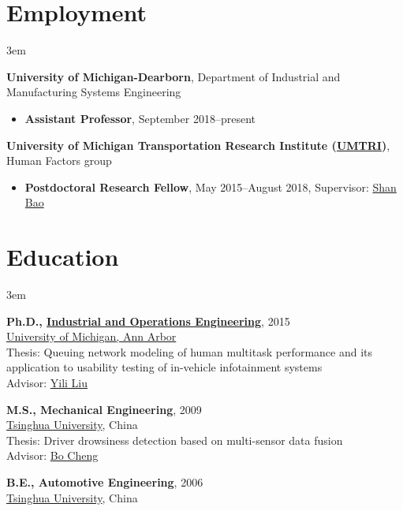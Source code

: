 \documentclass[11pt]{article}
\newenvironment{main}
{\begin{adjustwidth}{3em}{}}
{\end{adjustwidth}}
\begin{document}
\section*{Employment}
\begin{main}

\textbf{University of Michigan-Dearborn}, Department of Industrial and Manufacturing Systems Engineering

\begin{itemize}
    \item[] \textbf{Assistant Professor}, September 2018–present
\end{itemize}

\textbf{University of Michigan Transportation Research Institute (\href{http://www.umtri.umich.edu/}{UMTRI})}, Human Factors group

\begin{itemize}
    \item[] \textbf{Postdoctoral Research Fellow}, May 2015–August 2018, Supervisor: \href{https://sites.google.com/umich.edu/hfet-lab/people}{Shan Bao}
\end{itemize}


\end{main}
\section*{Education}
\begin{main}

\textbf{Ph.D., \href{https://ioe.engin.umich.edu/}{Industrial and Operations Engineering}}, 2015\\
\href{https://umich.edu/}{University of Michigan, Ann Arbor}\\
Thesis: Queuing network modeling of human multitask performance and its application to usability testing of in-vehicle infotainment systems\\
Advisor: \href{https://ioe.engin.umich.edu/people/yili-liu/}{Yili Liu}

\textbf{M.S., Mechanical Engineering}, 2009\\
\href{https://www.tsinghua.edu.cn/en/index.htm}{Tsinghua University}, China\\
Thesis: Driver drowsiness detection based on multi-sensor data fusion\\
Advisor: \href{http://www.svm.tsinghua.edu.cn/essay/74/364.html}{Bo Cheng}

\textbf{B.E., Automotive Engineering}, 2006\\
\href{https://www.tsinghua.edu.cn/en/index.htm}{Tsinghua University}, China


\end{main}
\end{document}
